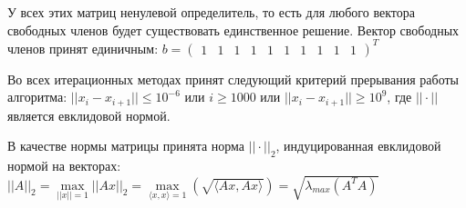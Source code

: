 \documentclass[../../report.tex]{subfiles}
\begin{document}
У всех этих матриц ненулевой определитель, то есть для любого вектора свободных членов будет существовать единственное решение. Вектор свободных членов принят единичным:
$b = \begin{pmatrix}
    1 & 1 & 1 & 1 & 1 & 1 & 1 & 1 & 1 & 1
\end{pmatrix} ^ T
$

Во всех итерационных методах принят следующий критерий прерывания работы алгоритма: $||x_i - x_{i+1}|| \leq 10^{-6}$ или $i \geq 1000$ или $||x_i - x_{i+1}|| \geq 10^9$, где $||\cdot||$ является евклидовой нормой.

В качестве нормы матрицы принята норма $||\cdot||_2$, индуцированная евклидовой нормой на векторах:
$  ||A||_2 = 
   \max\limits_{||x|| = 1} ||Ax||_2 = 
   \max\limits_{\langle x, x \rangle = 1}(\sqrt{ \langle Ax, Ax \rangle}) = 
   \sqrt{\lambda_{max}(A^T A)}$
\end{document}
